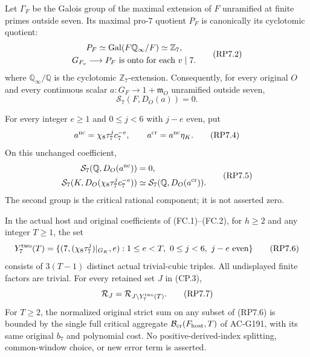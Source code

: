 \begin{theorem}
\label{AC-G201}
Let $\Gamma_F$ be the Galois group of the maximal extension of
$F$ unramified at finite primes outside seven. Its maximal
pro-$7$ quotient $P_F$ is canonically its cyclotomic quotient:
\[
 \begin{gathered}
 P_F\simeq\operatorname{Gal}(F\mathbb Q_\infty/F)
       \simeq\mathbb Z_7,\\
 G_{F_v}\longrightarrow P_F\ \hbox{is onto for each }v\mid7.
 \end{gathered}
 \tag{RP7.2}
\]
where $\mathbb Q_\infty/\mathbb Q$ is the cyclotomic
$\mathbb Z_7$-extension. Consequently, for every original $O$
and every continuous scalar $a:G_F\to1+\mathfrak m_O$
unramified outside seven,
\[
                     \mathcal S_7(F,D_O(a))=0.
 \tag{RP7.3}
\]

For every integer $e\geq1$ and $0\leq j<6$ with $j-e$ even,
put
\[
 a^{\rm nc}=\chi_8\tau_7^j c_7^{-e},
 \qquad a^{\rm cr}=a^{\rm nc}\eta_K.
 \tag{RP7.4}
\]
On this unchanged coefficient,
\[
 \begin{aligned}
 \mathcal S_7(\mathbb Q,D_O(a^{\rm nc}))&=0,\\
 \mathcal S_7(K,D_O(\chi_8\tau_7^j c_7^{-e}))
       &\simeq\mathcal S_7(\mathbb Q,D_O(a^{\rm cr})).
 \end{aligned}\tag{RP7.5}
\]
The second group is the critical rational component; it is not
asserted zero.

In the actual host and original coefficients of (FC.1)--(FC.2),
for $h\geq2$ and any integer $T\geq1$, the set
\[
 Y^{\rm two}_7(T)=
 \{(7,(\chi_8\tau_7^j)|_{G_K},e):
               1\leq e<T,\ 0\leq j<6,\ j-e\text{ even}\}
 \tag{RP7.6}
\]
consists of $3(T-1)$ distinct actual trivial-cubic triples.
All undisplayed finite factors are trivial. For every retained
set $J$ in (CP.3),
\[
                  \mathcal R_J=
                         \mathcal R_{J\setminus Y^{\rm two}_7(T)}.
 \tag{RP7.7}
\]
For $T\geq2$, the normalized original strict sum on any subset
of (RP7.6) is bounded by the single full critical aggregate
$\mathcal B_{\rm cr}(F_{\rm host},T)$ of AC-G191, with its same
original $b_7$ and polynomial cost. No positive-derived-index
splitting, common-window choice, or new error term is asserted.
\end{theorem}

